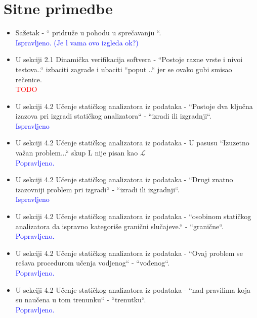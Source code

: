\documentclass[a4paper]{report}
\newcommand{\odgovor}[1]{\textcolor{blue}{#1}}
\newcommand{\todo}[1]{\textcolor{red}{#1}}
\begin{document}
\section{Sitne primedbe}
\begin{itemize}
   \item Sažetak - `` pridruže u pohodu u sprečavanju ``.
   \\\odgovor{Ispravljeno. (Je l vama ovo izgleda ok?)}
   
   \item U sekciji 2.1 Dinamička verifikacija softvera - ``Postoje razne vrste i nivoi testova..`` izbaciti zagrade i ubaciti ``poput ..`` jer se ovako gubi smisao rečenice.
   \\\todo{TODO}
   
   \item U sekciji 4.2 Učenje statičkog analizatora iz podataka - ``Postoje dva ključna izazova pri izgradi statičkog analizatora`` - ``izradi ili izgradnji``.
   \\\odgovor{Ispravljeno}
   
   \item U sekciji 4.2 Učenje statičkog analizatora iz podataka - U pasusu ``Izuzetno važan problem...`` skup L nije pisan kao $\mathcal{L}$
   \\\odgovor{Popravljeno.}
   
   \item U sekciji 4.2 Učenje statičkog analizatora iz podataka - ``Drugi znatno izazovniji problem pri izgradi`` - ``izradi ili izgradnji``.
   \\\odgovor{Ispravljeno}
   
   \item U sekciji 4.2 Učenje statičkog analizatora iz podataka - ``osobinom statičkog analizatora da ispravno kategoriše granični slučajeve.`` - ``granične``.
   \\\odgovor{Popravljeno.}
   
   \item U sekciji 4.2 Učenje statičkog analizatora iz podataka - ``Ovaj problem se rešava procedurom učenja vodjenog`` - ``vođenog``.
   \\\odgovor{Popravljeno.}
   
   \item U sekciji 4.2 Učenje statičkog analizatora iz podataka - ``nad pravilima koja su naučena u tom trenunku`` - ``trenutku``.
   \\\odgovor{Popravljeno.}
   

\end{itemize}
\end{document}
